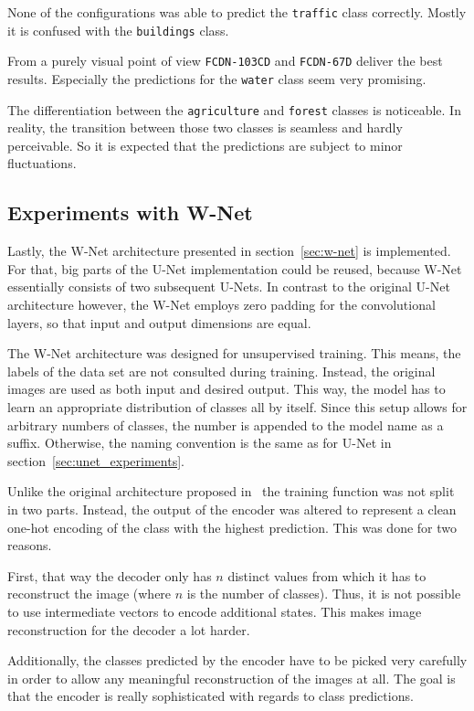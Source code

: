 None of the configurations was able to predict the \texttt{traffic} class correctly. Mostly it is confused with the \texttt{buildings} class.

From a purely visual point of view \texttt{FCDN-103CD} and \texttt{FCDN-67D} deliver the best results. Especially the predictions for the \texttt{water} class seem very promising.

The differentiation between the \texttt{agriculture} and \texttt{forest} classes is noticeable. In reality, the transition between those two classes is seamless and hardly perceivable. So it is expected that the predictions are subject to minor fluctuations.

\subsection{Experiments with W-Net}
\label{sec:wnet_experiments}
Lastly, the W-Net architecture presented in section~\ref{sec:w-net} is implemented. For that, big parts of the U-Net implementation could be reused, because W-Net essentially consists of two subsequent U-Nets. In contrast to the original U-Net architecture however, the W-Net employs zero padding for the convolutional layers, so that input and output dimensions are equal.

The W-Net architecture was designed for unsupervised training. This means, the labels of the data set are not consulted during training. Instead, the original images are used as both input and desired output. This way, the model has to learn an appropriate distribution of classes all by itself. Since this setup allows for arbitrary numbers of classes, the number is appended to the model name as a suffix. Otherwise, the naming convention is the same as for U-Net in section~\ref{sec:unet_experiments}.

Unlike the original architecture proposed in~\cite{wnet17} the training function was not split in two parts. Instead, the output of the encoder was altered to represent a clean one-hot encoding of the class with the highest prediction. This was done for two reasons.

First, that way the decoder only has $n$ distinct values from which it has to reconstruct the image (where $n$ is the number of classes). Thus, it is not possible to use intermediate vectors to encode additional states. This makes image reconstruction for the decoder a lot harder.

Additionally, the classes predicted by the encoder have to be picked very carefully in order to allow any meaningful reconstruction of the images at all. The goal is that the encoder is really sophisticated with regards to class predictions.


